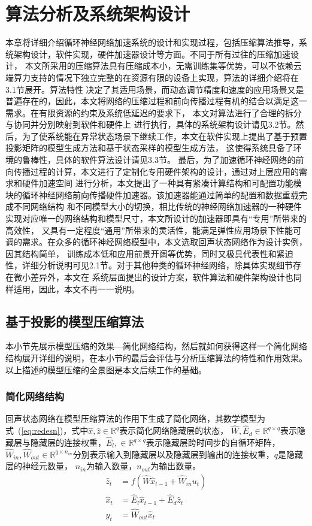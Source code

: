 \chapter{算法分析及系统架构设计}
本章将详细介绍循环神经网络加速系统的设计和实现过程，包括压缩算法推导，系统架构设计，软件实现，硬件加速器设计等方面。不同于所有过往的压缩加速设计，
本文所采用的压缩算法具有压缩成本小，无需训练集等优势，可以不依赖云端算力支持的情况下独立完整的在资源有限的设备上实现，算法的详细介绍将在3.1节展开。算法特性
决定了其适用场景，而动态调节精度和速度的应用场景又是普遍存在的，因此，本文将网络的压缩过程和前向传播过程有机的结合以满足这一需求。在有限资源的约束及系统低延迟的要求下，
本文对算法进行了合理的拆分与协同并分别映射到软件和硬件上
进行执行，具体的系统架构设计请见3.2节。然后，为了使系统能在异常状态场景下继续工作，本文在软件实现上提出了基于预置投影矩阵的模型生成方法和基于状态采样的模型生成方法，
这使得系统具备了环境的鲁棒性，具体的软件算法设计请见3.3节。
最后，为了加速循环神经网络的前向传播过程的计算，本文进行了定制化专用硬件架构的设计，通过对上层应用的需求和硬件加速空间
进行分析，本文提出了一种具有紧凑计算结构和可配置功能模块的循环神经网络前向传播硬件加速器。该加速器能通过简单的配置和数据重载完成不同网络结构
和不同模型大小的切换，相比传统的神经网络加速器的一种硬件实现对应唯一的网络结构和模型尺寸，本文所设计的加速器即具有“专用”所带来的高效性，
又具有一定程度“通用”所带来的灵活性，能满足弹性应用场景下性能可调的需求。在众多的循环神经网络模型中，本文选取回声状态网络作为设计实例，因其结构简单，
训练成本低和应用前景开阔等优势，同时又极具代表性和紧迫性，详细分析说明可见2.1节。对于其他种类的循环神经网络，除具体实现细节存在微小差异外，本文在
系统层面提出的设计方案，软件算法和硬件架构设计也同样适用，因此，本文不再一一说明。
\section{基于投影的模型压缩算法}
本小节先展示模型压缩的效果---简化网络结构，然后就如何获得这样一个简化网络结构展开详细的说明，在本小节的最后会评估与分析压缩算法的特性和作用效果。
以上描述的模型压缩的全景图是本文后续工作的基础。
\subsection{简化网络结构}
回声状态网络在模型压缩算法的作用下生成了简化网络，其数学模型为式~(\ref{eq:redesn})，式中\(\widehat{x},\widehat{z} \in \mathbb{R}^q\)表示简化网络隐藏层的状态，
\(\widehat{W}, \widehat{E}_d \in \mathbb{R}^{q \times q}\)表示隐藏层与隐藏层的连接权重，\(\widehat{E}_l,\in \mathbb{R}^{q \times q}\)表示隐藏层跨时间步的自循环矩阵，
\(\widehat{W}_{in},\widehat{W}_{out}\in \mathbb{R}^{q \times n_{in}}\)分别表示输入到隐藏层以及隐藏层到输出的连接权重，\(q\)是隐藏层的神经元数量，
\(n_{in}\)为输入数量，\(n_{out}\)为输出数量。
\begin{equation}\label{eq:redesn}
	\begin{split}
		\widehat{z}_t &= f(\widehat{W}  \widehat{x}_{t-1} + \widehat{W}_{in}  u_{t})				\\	
		\widehat{x}_t &= \widehat{E}_l  \widehat{x}_{t-1} + \widehat{E}_d  \widehat{z}_{t} 		\\
		y_{t} 			&= \widehat{W}_{out}  \widehat{x}_{t}	
	\end{split}
\end{equation}

